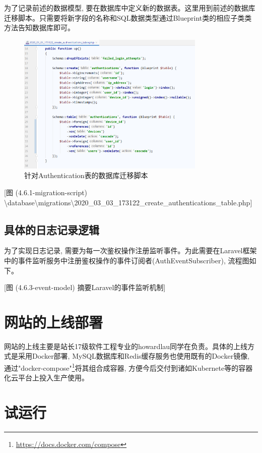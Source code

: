 为了记录前述的数据模型, 要在数据库中定义新的数据表。这里用到前述的数据库迁移脚本。只需要将新字段的名称和SQL数据类型通过Blueprint类的相应子类类方法告知数据库即可。

\begin{figure}[h]
    \centering
    \includegraphics[width=0.8\textwidth]{support-files/4.6.1-migration-script.png}
    \caption{针对Authentication表的数据库迁移脚本}
    \label{fig:authmigratescript}
\end{figure}

[图 (4.6.1-migration-script) \textbackslash database\textbackslash migrations\textbackslash 2020\_03\_03\_173122\_create\_authentications\_table.php]

\subsection{具体的日志记录逻辑}

为了实现日志记录, 需要为每一次鉴权操作注册监听事件。为此需要在Laravel框架中的事件监听服务中注册鉴权操作的事件订阅者(AuthEventSubscriber), 流程图如下。

[图 (4.6.3-event-model) 摘要Laravel的事件监听机制]


\section{网站的上线部署}

网站的上线主要是站长17级软件工程专业的howardlau同学在负责。具体的上线方式是采用Docker部署, MySQL数据库和Redis缓存服务也使用既有的Docker镜像, 通过"docker-compose"\footnote{\url{https://docs.docker.com/compose}}将其组合成容器, 方便今后交付到诸如Kubernete等的容器化云平台上投入生产使用。

\section{试运行}
\label{sec:preop}

